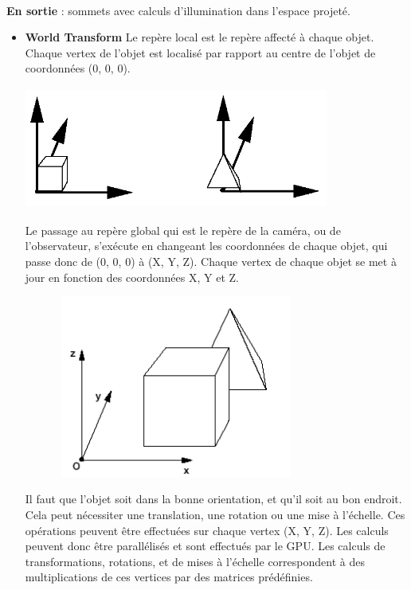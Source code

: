 \textbf{\\En sortie} : sommets avec calculs d’illumination dans l’espace projeté.\\
\begin{itemize}
  \item{\textbf{World Transform}}
Le repère local est le repère affecté à chaque objet. Chaque vertex de l’objet est localisé par rapport au centre de l’objet de coordonnées (0, 0, 0).
\\
\begin{center}
\includegraphics[width=10cm,height=40mm]{pipeline/images/repereLocal.png}
\end{center}

Le passage au repère global qui est le repère de la caméra, ou de l’observateur, s’exécute en changeant les coordonnées de chaque objet, qui passe donc de (0, 0, 0) à (X, Y, Z). Chaque vertex de chaque objet se met à jour en fonction des coordonnées X, Y et Z.
\\
\begin{center}
\includegraphics[width=10cm,height=60mm]{pipeline/images/repereGlobal.png}\\
\end{center}

Il faut que l’objet soit dans la bonne orientation, et qu’il soit au bon endroit. Cela peut nécessiter une translation, une rotation ou une mise à l’échelle. Ces opérations peuvent être effectuées sur chaque vertex (X, Y, Z). Les calculs peuvent donc être parallélisés et sont effectués par le GPU. Les calculs de transformations, rotations, et de mises à l’échelle correspondent à des multiplications de ces vertices par des matrices prédéfinies.\\


\end{itemize}
